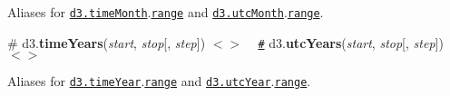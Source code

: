 Aliases for \href{#timeMonth}{\tt d3.\+time\+Month}.\href{#interval_range}{\tt range} and \href{#timeMonth}{\tt d3.\+utc\+Month}.\href{#interval_range}{\tt range}.

\label{_timeYears}%
\# d3.{\bfseries time\+Years}({\itshape start}, {\itshape stop}\mbox{[}, {\itshape step}\mbox{]}) \href{https://github.com/d3/d3-time/blob/master/src/year.js#L26}{\tt $<$$>$} ~\newline
\href{#timeYears}{\tt \#} d3.{\bfseries utc\+Years}({\itshape start}, {\itshape stop}\mbox{[}, {\itshape step}\mbox{]}) \href{https://github.com/d3/d3-time/blob/master/src/utcYear.js#L26}{\tt $<$$>$}

Aliases for \href{#timeYear}{\tt d3.\+time\+Year}.\href{#interval_range}{\tt range} and \href{#timeYear}{\tt d3.\+utc\+Year}.\href{#interval_range}{\tt range}. 